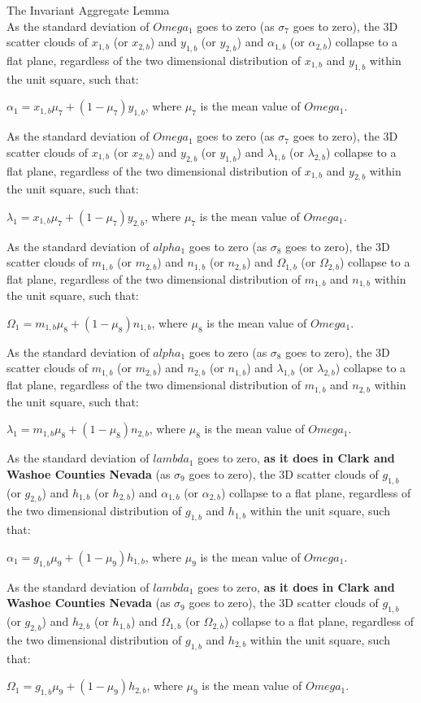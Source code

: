 \newpage
\begin{corollary}{The Invariant Aggregate Lemma}\\
As the standard deviation of $Omega_{1}$ goes to zero (as $\sigma_{7}$ goes to zero), the 3D scatter clouds of $x_{1,b}$ (or $x_{2,b}$) and $y_{1,b}$ (or $y_{2,b}$) and $\alpha_{1,b}$ (or $\alpha_{2,b}$) collapse to a flat plane, regardless of the two dimensional distribution of $x_{1,b}$ and $y_{1,b}$ within the unit square, such that:

$\alpha_{1}=x_{1,b}\mu_{7}+(1-\mu_{7})y_{1,b}$, where $\mu_{7}$ is the mean value of $Omega_{1}$.

As the standard deviation of $Omega_{1}$ goes to zero (as $\sigma_{7}$ goes to zero), the 3D scatter clouds of $x_{1,b}$ (or $x_{2,b}$) and $y_{2,b}$ (or $y_{1,b}$) and $\lambda_{1,b}$ (or $\lambda_{2,b}$) collapse to a flat plane, regardless of the two dimensional distribution of $x_{1,b}$ and $y_{2,b}$ within the unit square, such that:

$\lambda_{1}=x_{1,b}\mu_{7}+(1-\mu_{7})y_{2,b}$, where $\mu_{7}$ is the mean value of $Omega_{1}$.

As the standard deviation of $alpha_{1}$ goes to zero (as $\sigma_{8}$ goes to zero), the 3D scatter clouds of $m_{1,b}$ (or $m_{2,b}$) and $n_{1,b}$ (or $n_{2,b}$) and $\Omega_{1,b}$ (or $\Omega_{2,b}$) collapse to a flat plane, regardless of the two dimensional distribution of $m_{1,b}$ and $n_{1,b}$ within the unit square, such that:

$\Omega_{1}=m_{1,b}\mu_{8}+(1-\mu_{8})n_{1,b}$, where $\mu_{8}$ is the mean value of $Omega_{1}$.

As the standard deviation of $alpha_{1}$ goes to zero (as $\sigma_{8}$ goes to zero), the 3D scatter clouds of $m_{1,b}$ (or $m_{2,b}$) and $n_{2,b}$ (or $n_{1,b}$) and $\lambda_{1,b}$ (or $\lambda_{2,b}$) collapse to a flat plane, regardless of the two dimensional distribution of $m_{1,b}$ and $n_{2,b}$ within the unit square, such that:

$\lambda_{1}=m_{1,b}\mu_{8}+(1-\mu_{8})n_{2,b}$, where $\mu_{8}$ is the mean value of $Omega_{1}$. 

As the standard deviation of $lambda_{1}$ goes to zero, \textbf{as it does in Clark and Washoe Counties Nevada} (as $\sigma_{9}$ goes to zero), the 3D scatter clouds of $g_{1,b}$ (or $g_{2,b}$) and $h_{1,b}$ (or $h_{2,b}$) and $\alpha_{1,b}$ (or $\alpha_{2,b}$) collapse to a flat plane, regardless of the two dimensional distribution of $g_{1,b}$ and $h_{1,b}$ within the unit square, such that:

$\alpha_{1}=g_{1,b}\mu_{9}+(1-\mu_{9})h_{1,b}$, where $\mu_{9}$ is the mean value of $Omega_{1}$.

As the standard deviation of $lambda_{1}$ goes to zero, \textbf{as it does in Clark and Washoe Counties Nevada} (as $\sigma_{9}$ goes to zero), the 3D scatter clouds of $g_{1,b}$ (or $g_{2,b}$) and $h_{2,b}$ (or $h_{1,b}$) and $\Omega_{1,b}$ (or $\Omega_{2,b}$) collapse to a flat plane, regardless of the two dimensional distribution of $g_{1,b}$ and $h_{2,b}$ within the unit square, such that:

$\Omega_{1}=g_{1,b}\mu_{9}+(1-\mu_{9})h_{2,b}$, where $\mu_{9}$ is the mean value of $Omega_{1}$.
\end{corollary}
